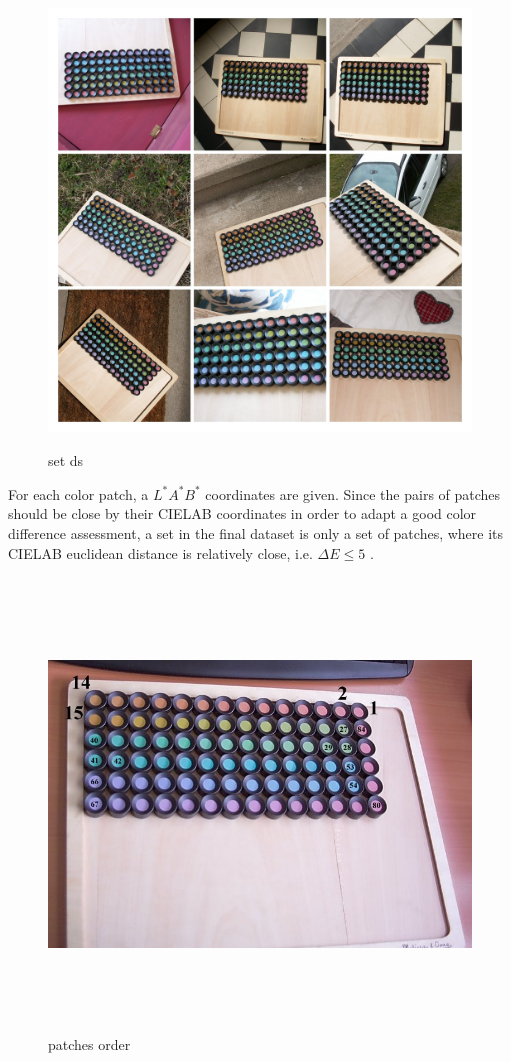 \begin{figure}[h] \label{set_ds}
			\includegraphics[width=\linewidth,height=12cm,keepaspectratio]{Figures/set_ds}
			\caption[set ds]
			{set ds}
\end{figure}

For each color patch, a $L^*A^*B^*$ \cite{lab} coordinates are given. 
Since the pairs of patches should be close by their CIELAB \cite{CIELAB} coordinates in order to adapt a good color difference assessment, a set in the final dataset is only a set of patches, where its CIELAB euclidean distance is relatively close, i.e. $\Delta E \leq 5$ .


\begin{figure}[h] \label{patch_positions}
			\includegraphics[width=\linewidth,height=12cm,keepaspectratio]{Figures/patch_positions}
			\caption[patches order]
			{patches order}
\end{figure}


